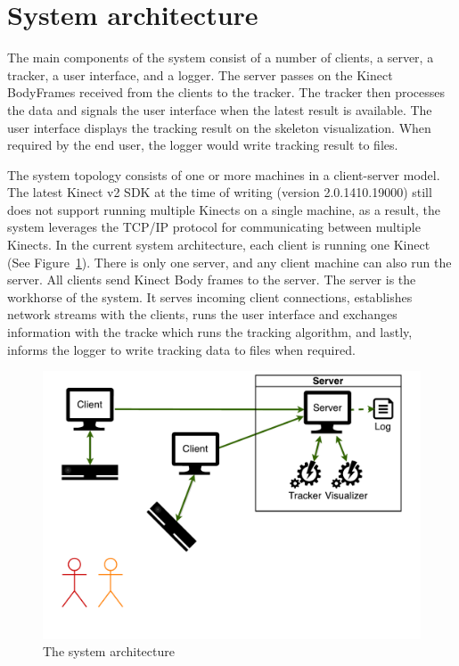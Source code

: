 \section{System architecture}
\label{sec:design_architecture}

The main components of the system consist of a number of clients, a server, a tracker, a user interface, and a logger. The server passes on the Kinect BodyFrames received from the clients to the tracker. The tracker then processes the data and signals the user interface when the latest result is available. The user interface displays the tracking result on the skeleton visualization. When required by the end user, the logger would write tracking result to files.

The system topology consists of one or more machines in a client-server model. The latest Kinect v2 SDK at the time of writing (version 2.0.1410.19000) still does not support running multiple Kinects on a single machine, as a result, the system leverages the TCP/IP protocol for communicating between multiple Kinects. In the current system architecture, each client is running one Kinect (See Figure~\ref{fig:system_architecture}). There is only one server, and any client machine can also run the server. All clients send Kinect Body frames to the server. The server is the workhorse of the system. It serves incoming client connections, establishes network streams with the clients, runs the user interface and exchanges information with the tracke which runs the tracking algorithm, and lastly, informs the logger to write tracking data to files when required.

\begin{figure}[!h]
  \centering

  \includegraphics[width=0.8\linewidth]{figs/system_architecture}
  
  \caption{The system architecture}
  
  \label{fig:system_architecture}
\end{figure}


